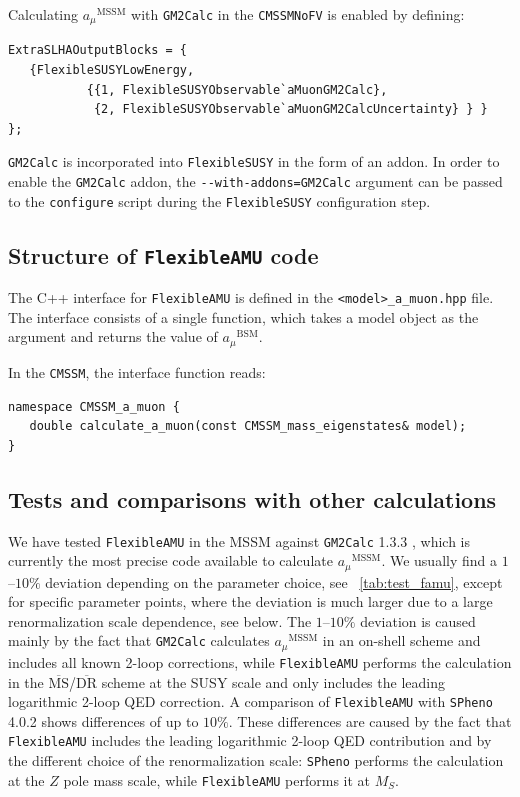 \documentclass[final,3p,11pt,pdflatex]{elsarticle}
\makeatletter
\newcommand{\modelname}[1]{\texttt{#1}\@\xspace}
\newcommand{\spheno}{\texttt{SPheno}\@\xspace}
\newcommand{\fs}{\texttt{FlexibleSUSY}\@\xspace}
\newcommand{\GMTCalc}{\texttt{GM2Calc}\@\xspace}
\newcommand{\famu}{\texttt{FlexibleAMU}\@\xspace}
\newcommand{\code}[1]{\lstinline|#1|}  %
\newcommand{\ol}[1]{\overline{#1}}
\newcommand{\MSbar}{\ensuremath{\ol{\text{MS}}}\xspace}
\newcommand{\DRbar}{\ensuremath{\ol{\text{DR}}}\xspace}
\newcommand{\BSM}{\ensuremath{\text{BSM}}\xspace}
\newcommand{\MSSM}{\ensuremath{\text{MSSM}}\xspace}
\newcommand{\MS}{\ensuremath{M_S}\xspace}
\newcommand{\amu}{\ensuremath{a_\mu}\xspace}
\newcommand{\amuBSM}{\ensuremath{\amu^{\BSM}}\xspace}
\newcommand{\amuMSSM}{\ensuremath{\amu^{\MSSM}}\xspace}
\newcommand{\tabref}[1]{\tablename~\ref{#1}}
\makeatother
\begin{document}
\begin{example}
Calculating \amuMSSM with \GMTCalc in the \modelname{CMSSMNoFV} is
enabled by defining:
%
\begin{lstlisting}
ExtraSLHAOutputBlocks = {
   {FlexibleSUSYLowEnergy,
           {{1, FlexibleSUSYObservable`aMuonGM2Calc},
            {2, FlexibleSUSYObservable`aMuonGM2CalcUncertainty} } }
};
\end{lstlisting}
\end{example}

\GMTCalc is incorporated into \fs in the form of an addon.
In order to enable the \GMTCalc addon, the
\code{--with-addons=GM2Calc} argument can be passed to the
\code{configure} script during the \fs configuration step.

\subsection{Structure of \famu code}

The C++ interface for \famu is defined in the
\code{<model>_a_muon.hpp} file.  The interface consists of a single
function, which takes a model object as the argument and returns the value
of \amuBSM.

\begin{example}
In the \modelname{CMSSM}, the interface function reads:
%
\begin{lstlisting}
namespace CMSSM_a_muon {
   double calculate_a_muon(const CMSSM_mass_eigenstates& model);
}
\end{lstlisting}
\end{example}

\subsection{Tests and comparisons with other calculations}

We have tested \famu in the MSSM against \GMTCalc 1.3.3
\cite{Athron:2015rva}, which is currently the most precise code
available to calculate \amuMSSM.  We usually find a $1$--$10\%$
deviation depending on the parameter choice, see
\tabref{tab:test_famu}, except for specific parameter points, where
the deviation is much larger due to a large renormalization scale
dependence, see below.  The $1$--$10\%$ deviation is caused mainly by
the fact that \GMTCalc calculates \amuMSSM in an on-shell scheme and
includes all known 2-loop corrections, while \famu performs the
calculation in the \MSbar/\DRbar scheme at the SUSY scale and only
includes the leading logarithmic 2-loop QED correction.  A comparison
of \famu with \spheno 4.0.2 shows differences of up to $10\%$.  These
differences are caused by the fact that \famu includes the leading
logarithmic 2-loop QED contribution and by the different choice of the
renormalization scale: \spheno performs the calculation at the $Z$ pole
mass scale, while \famu performs it at $\MS$.
\end{document}
